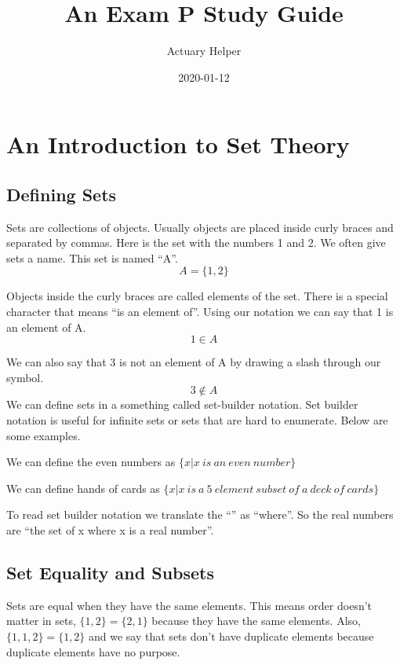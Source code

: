 \documentclass[
]{book}
\title{An Exam P Study Guide}
\author{Actuary Helper}
\date{2020-01-12}
\theoremstyle{definition}
\theoremstyle{definition}
\theoremstyle{definition}
\theoremstyle{remark}
\begin{document}
\frontmatter
\maketitle

{
\setcounter{tocdepth}{1}
\tableofcontents
}
\mainmatter
\hypertarget{an-introduction-to-set-theory}{%
\chapter{An Introduction to Set Theory}\label{an-introduction-to-set-theory}}

\hypertarget{defining-sets}{%
\section{Defining Sets}\label{defining-sets}}

Sets are collections of objects. Usually objects are placed inside curly braces and separated by commas. Here is the set with the numbers 1 and 2. We often give sets a name. This set is named ``A''. \[A=\{1,2\}\]

Objects inside the curly braces are called elements of the set. There is a special character that means ``is an element of''. Using our notation we can say that 1 is an element of A. \[1 \in A\]

We can also say that 3 is not an element of A by drawing a slash through our symbol.
\[3 \not\in A\]
We can define sets in a something called set-builder notation. Set builder notation is useful for infinite sets or sets that are hard to enumerate. Below are some examples.

We can define the even numbers as \(\{x | x \ is \  an \  even \ number\}\)

We can define hands of cards as \(\{x | x \ is \  a \ 5 \ element \ subset \ of \ a \ deck \ of \ cards\}\)

To read set builder notation we translate the ``\textbar{}'' as ``where''. So the real numbers are ``the set of x where x is a real number''.

\hypertarget{set-equality-and-subsets}{%
\section{Set Equality and Subsets}\label{set-equality-and-subsets}}

Sets are equal when they have the same elements. This means order doesn't matter in sets, \(\{1,2\} = \{2,1\}\) because they have the same elements. Also, \(\{1,1,2\} = \{1,2\}\) and we say that sets don't have duplicate elements because duplicate elements have no purpose.
\end{document}
